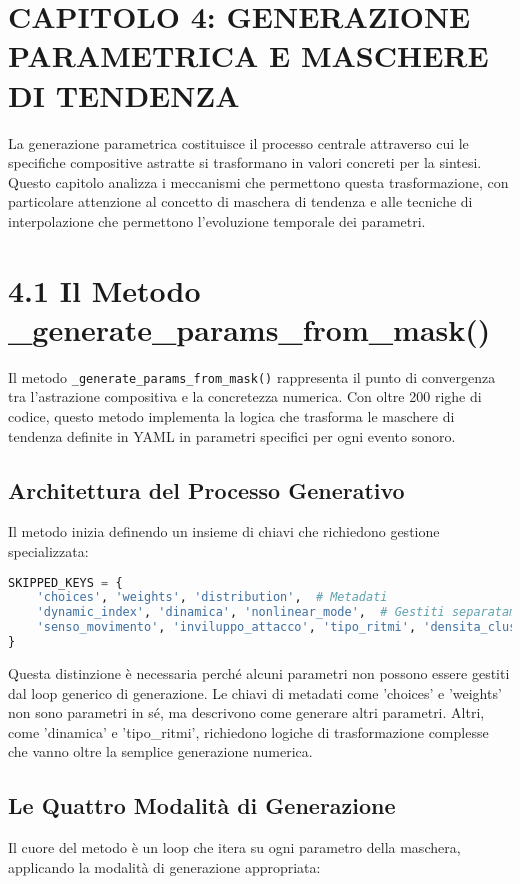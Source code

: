 
\section{CAPITOLO 4: GENERAZIONE PARAMETRICA E MASCHERE DI TENDENZA}
La generazione parametrica costituisce il processo centrale attraverso cui le specifiche compositive astratte si trasformano in valori concreti per la sintesi. Questo capitolo analizza i meccanismi che permettono questa trasformazione, con particolare attenzione al concetto di maschera di tendenza e alle tecniche di interpolazione che permettono l'evoluzione temporale dei parametri.
\section{4.1 Il Metodo _generate_params_from_mask()}
Il metodo \texttt{\_generate\_params\_from\_mask()} rappresenta il punto di convergenza tra l'astrazione compositiva e la concretezza numerica. Con oltre 200 righe di codice, questo metodo implementa la logica che trasforma le maschere di tendenza definite in YAML in parametri specifici per ogni evento sonoro.
\subsection{Architettura del Processo Generativo}
Il metodo inizia definendo un insieme di chiavi che richiedono gestione specializzata:

\begin{lstlisting}[language=Python]
SKIPPED_KEYS = {
    'choices', 'weights', 'distribution',  # Metadati
    'dynamic_index', 'dinamica', 'nonlinear_mode',  # Gestiti separatamente
    'senso_movimento', 'inviluppo_attacco', 'tipo_ritmi', 'densita_cluster'
}
\end{lstlisting}

Questa distinzione è necessaria perché alcuni parametri non possono essere gestiti dal loop generico di generazione. Le chiavi di metadati come 'choices' e 'weights' non sono parametri in sé, ma descrivono come generare altri parametri. Altri, come 'dinamica' e 'tipo_ritmi', richiedono logiche di trasformazione complesse che vanno oltre la semplice generazione numerica.
\subsection{Le Quattro Modalità di Generazione}
Il cuore del metodo è un loop che itera su ogni parametro della maschera, applicando la modalità di generazione appropriata:

